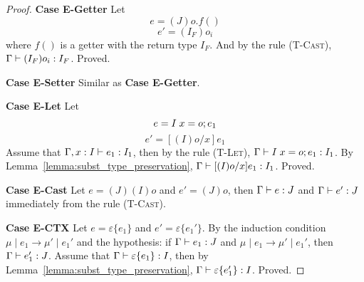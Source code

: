 \begin{proof}
\indent \textbf{Case E-Getter} Let
$$e = (J)o.f()$$
$$e' = (I_F)o_i$$
where $f()$ is a getter with the return type $I_F$. And by the rule \textsc{(T-Cast)}, $\Gamma \; {\vdash} \; (I_F)o_i:I_F$. Proved.

\indent \textbf{Case E-Setter}
Similar as \textbf{Case E-Getter}.

\indent \textbf{Case E-Let} Let
$$e = I \; x = o;e_1$$
$$e' = [(I)o/x]e_1$$
Assume that $\Gamma, x : I \; {\vdash} \; e_1 : I_1$, then by the rule \textsc{(T-Let)}, $\Gamma \; {\vdash} \; I \; x = o;e_1 : I_1$.
By Lemma~\ref{lemma:subst_type_preservation}, $\Gamma \; {\vdash} \; [(I)o/x]e_1 : I_1$. Proved.

\indent \textbf{Case E-Cast} 
Let $e = (J)(I)o$ and $e' = (J)o$, then $\Gamma \; {\vdash} \; e : J$ and $\Gamma \; {\vdash} \; e' : J$ immediately from the rule \textsc{(T-Cast)}.

\indent \textbf{Case E-CTX}
Let $e = \varepsilon\{e_1\}$ and $e' = \varepsilon\{e_1'\}$.
By the induction condition $\mu \mid e_1 \to \mu' \mid e_1'$ and the hypothesis:
if $\Gamma \; {\vdash} \; e_1:J$ and $\mu \mid e_1 \to \mu' \mid e_1'$, then 
$\Gamma \; {\vdash} \; e_1' : J$. Assume that $\Gamma \; {\vdash} \; \varepsilon\{e_1\} : I$, then by Lemma~\ref{lemma:subst_type_preservation}, 
$\Gamma \; {\vdash} \; \varepsilon\{e_1'\} : I$. Proved.
\end{proof}


